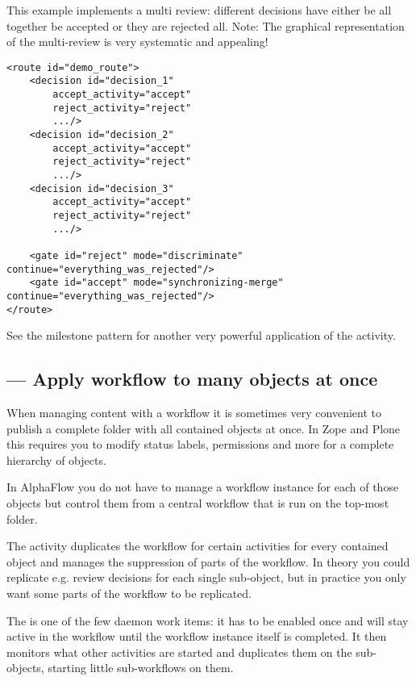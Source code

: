 This example implements a multi review: different decisions have either be all
together be accepted or they are rejected all. Note: The graphical
representation of the multi-review is very systematic and appealing!

\begin{verbatim}
<route id="demo_route">
    <decision id="decision_1"
        accept_activity="accept" 
        reject_activity="reject" 
        .../>
    <decision id="decision_2"
        accept_activity="accept" 
        reject_activity="reject" 
        .../>
    <decision id="decision_3"
        accept_activity="accept" 
        reject_activity="reject" 
        .../>

    <gate id="reject" mode="discriminate" continue="everything_was_rejected"/>
    <gate id="accept" mode="synchronizing-merge" continue="everything_was_rejected"/>
</route>
\end{verbatim}

See the milestone pattern for another very powerful application of the  activity.

\subsection{ --- Apply workflow to many objects at once}


When managing content with a workflow it is sometimes very convenient to
publish a complete folder with all contained objects at once. In Zope and Plone
this requires you to modify status labels, permissions and more for a complete
hierarchy of objects.

In AlphaFlow you do not have to manage a workflow instance for each of those
objects but control them from a central workflow that is run on the top-most
folder.

The  activity duplicates the workflow for certain activities
for every contained object and manages the suppression of parts of the
workflow. In theory you could replicate e.g. review decisions for each single
sub-object, but in practice you only want some parts of the workflow to be
replicated.

The  is one of the few daemon work items: it has to be
enabled once and will stay active in the workflow until the workflow instance
itself is completed. It then monitors what other activities are started and
duplicates them on the sub-objects, starting little sub-workflows on them.

